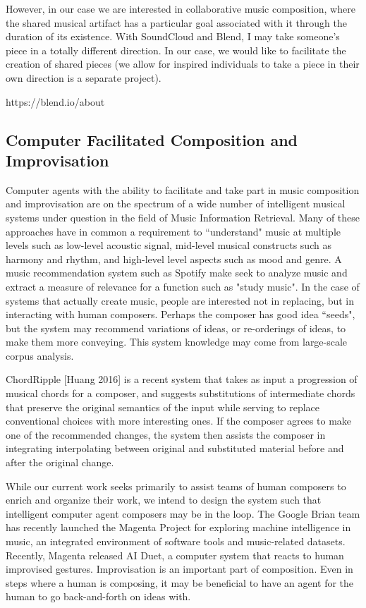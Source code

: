 \documentclass[final,authoryear,11pt,times]{elsarticle}
\begin{document}
However, in our case we are interested in collaborative music composition, where the shared musical artifact has a particular goal associated with it through the duration of its existence. With SoundCloud and Blend, I may take someone's piece in a totally different direction. In our case, we would like to facilitate the creation of shared pieces (we allow for inspired individuals to take a piece in their own direction is a separate project).

https://blend.io/about 

\subsection{Computer Facilitated Composition and Improvisation}

Computer agents with the ability to facilitate and take part in music composition and improvisation are on the spectrum of a wide number of intelligent musical systems under question in the field of Music Information Retrieval. Many of these approaches have in common a requirement to ``understand" music at multiple levels such as low-level acoustic signal, mid-level musical constructs such as harmony and rhythm, and high-level level aspects such as mood and genre. A music recommendation system such as Spotify make seek to analyze music and extract a measure of relevance for a function such as "study music". In the case of systems that actually create music, people are interested not in replacing, but in interacting with human composers. Perhaps the composer has good idea ``seeds", but the system may recommend variations of ideas, or re-orderings of ideas, to make them more conveying. This system knowledge may come from large-scale corpus analysis.

ChordRipple [Huang 2016] is a recent system that takes as input a progression of musical chords for a composer, and suggests substitutions of intermediate chords that preserve the original semantics of the input while serving to replace conventional choices with more interesting ones. If the composer agrees to make one of the recommended changes, the system then assists the composer in integrating interpolating between original and substituted material before and after the original change.

While our current work seeks primarily to assist teams of human composers to enrich and organize their work, we intend to design the system such that intelligent computer agent composers may be in the loop. The Google Brian team has recently launched the Magenta Project for exploring machine intelligence in music, an integrated environment of software tools and music-related datasets. Recently, Magenta released AI Duet, a computer system that reacts to human improvised gestures. Improvisation is an important part of composition. Even in steps where a human is composing, it may be beneficial to have an agent for the human to go back-and-forth on ideas with. 
\end{document}
